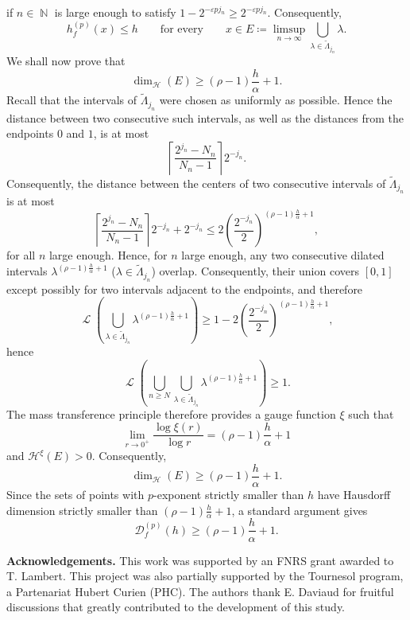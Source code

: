 \documentclass[a4paper,11pt,oneside]{article}
\DeclareMathOperator{\N}{\mathbb{N}}
\DeclareMathOperator{\leb}{\mathcal{L}}
\newcommand{\ccint}[1]{\left[{#1}\right]}
\theoremstyle{definition}
\theoremstyle{plain}
\begin{document}
if $n\in\N$ is large enough to satisfy $1-2^{-\varepsilon pj_n}\geq 2^{-\varepsilon pj_n}$. 
Consequently,
\[
h_f^{(p)}(x)\leq h
\qquad\text{for every}\qquad
x\in
E\coloneqq
\limsup_{n\to\infty}
\bigcup_{\lambda\in\widetilde{\Lambda}_{j_n}}\lambda.
\]
We shall now prove that
\[
\dim_{\mathcal H}(E)
\geq
(\rho-1)\frac{h}{\alpha}+1.
\]
Recall that the intervals of $\widetilde{\Lambda}_{j_n}$ were chosen as
uniformly as possible. Hence the distance between two consecutive such
intervals, as well as the distances from the endpoints $0$ and $1$, is at
most
\[
\left\lceil
\frac{2^{j_n}-N_n}{N_n-1}
\right\rceil 2^{-j_n}.
\]
Consequently, the distance between the centers of two consecutive
intervals of $\widetilde{\Lambda}_{j_n}$ is at most
\[
\left\lceil\frac{2^{j_n}-N_n}{N_n-1}\right\rceil 2^{-j_n}+2^{-j_n} 
\leq 2\left(\frac{2^{-j_n}}{2}\right)^{(\rho-1)\frac{h}{\alpha}+1}, 
\]
for all $n$ large enough. Hence, for $n$ large enough, any two consecutive dilated intervals $\lambda^{(\rho-1)\frac{h}{\alpha}+1}$ ($\lambda\in\widetilde{\Lambda}_{j_n}$) overlap. Consequently, their union covers $\ccint{0,1}$ except possibly
for two intervals adjacent to the endpoints, and therefore 
\[
\leb\left(\bigcup_{\lambda\in\widetilde{\Lambda}_{j_n}}\lambda^{(\rho-1)\frac{h}{\alpha}+1}\right) \geq 1-2\left(\frac{2^{-j_n}}{2}\right)^{(\rho-1)\frac{h}{\alpha}+1},
\]
hence
\[
\leb\left(\bigcup_{n\geq N}\bigcup_{\lambda\in\widetilde{\Lambda}_{j_n}}\lambda^{(\rho-1)\frac{h}{\alpha}+1}\right) \geq 1.
\]
The mass transference principle therefore  provides a gauge function $\xi$ such that
\[
\lim_{r\to0^+}\frac{\log\xi(r)}{\log r}
=
(\rho-1)\frac{h}{\alpha}+1
\]
and $\mathcal H^\xi(E)>0$. Consequently,
\[
\dim_{\mathcal H}(E)
\geq
(\rho-1)\frac{h}{\alpha}+1.
\]
Since the sets of points with $p$-exponent strictly smaller than $h$
have Hausdorff dimension strictly smaller than $(\rho-1)\frac{h}{\alpha}+1$, a standard argument
gives
\[
\mathscr D_f^{(p)}(h)\ge (\rho-1)\frac{h}{\alpha}+1.
\]



\bigskip



\noindent \textbf{Acknowledgements.} This work was supported by an FNRS grant awarded to T. Lambert. This project was also partially supported by the Tournesol program, a Partenariat Hubert Curien (PHC).  The authors thank E. Daviaud for fruitful discussions that greatly contributed to the development of this study.



\end{document}
